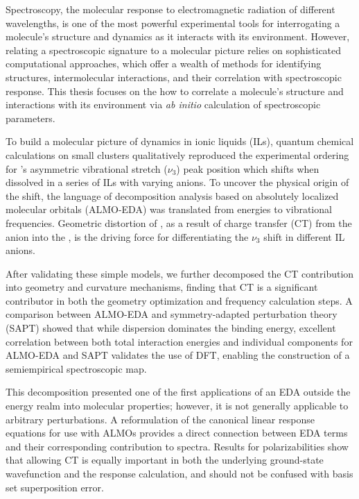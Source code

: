 \documentclass[%
  class = article,%
  crop = false,%
  float = true,%
  multi = true,%
  preview = false,%
]{standalone}
\newcommand{\arlidimer}{\ce{Ar\bond{....}Li+}}
\begin{document}
Spectroscopy, the molecular response to electromagnetic radiation of different wavelengths, is one of the most powerful experimental tools for interrogating a molecule's structure and dynamics as it interacts with its environment. However, relating a spectroscopic signature to a molecular picture relies on sophisticated computational approaches, which offer a wealth of methods for identifying structures, intermolecular interactions, and their correlation with spectroscopic response. This thesis focuses on the how to correlate a molecule's structure and interactions with its environment via \textit{ab initio} calculation of spectroscopic parameters.

To build a molecular picture of  dynamics in ionic liquids (ILs), quantum chemical calculations on small clusters qualitatively reproduced the experimental ordering for 's asymmetric vibrational stretch (\(\nu_3\)) peak position which shifts when dissolved in a series of ILs with varying anions. To uncover the physical origin of the shift, the language of decomposition analysis based on absolutely localized molecular orbitals (ALMO-EDA) was translated from energies to vibrational frequencies. Geometric distortion of , as a result of charge transfer (CT) from the anion into the , is the driving force for differentiating the  \(\nu_3\) shift in different IL anions.

After validating these simple models, we further decomposed the CT contribution into geometry and curvature mechanisms, finding that CT is a significant contributor in both the geometry optimization and frequency calculation steps. A comparison between ALMO-EDA and symmetry-adapted perturbation theory (SAPT) showed that while dispersion dominates the binding energy, excellent correlation between both total interaction energies and individual components for ALMO-EDA and SAPT validates the use of DFT, enabling the construction of a semiempirical spectroscopic map.

This decomposition presented one of the first applications of an EDA outside the energy realm into molecular properties; however, it is not generally applicable to arbitrary perturbations. A reformulation of the canonical linear response equations for use with ALMOs provides a direct connection between EDA terms and their corresponding contribution to spectra. Results for \arlidimer{} polarizabilities show that allowing CT is equally important in both the underlying ground-state wavefunction and the response calculation, and should not be confused with basis set superposition error.
\end{document}
